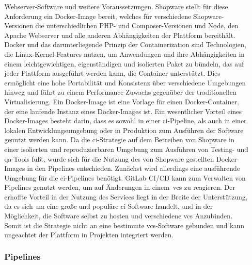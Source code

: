 Webserver-Software und weitere Voraussetzungen.
Shopware stellt für diese Anforderung ein Docker-Image bereit, welches für verschiedene Shopware-Versionen
die unterschiedlichen PHP- und Composer-Versionen und Node, den Apache Webserver und alle anderen Abhängigkeiten
der Plattform bereithält.
Docker und das darunterliegende Prinzip der Containerization sind Technologien, die Linux-Kernel-Features nutzen, um
Anwendungen und ihre Abhängigkeiten in einem leichtgewichtigen, eigenständigen und isolierten Paket zu bündeln, das auf
jeder Plattform ausgeführt werden kann, die Container unterstützt.
Dies ermöglicht eine hohe Portabilität und Konsistenz über verschiedene Umgebungen hinweg und führt zu einem
Performance-Zuwachs gegenüber der traditionellen Virtualisierung.
Ein Docker-Image ist eine Vorlage für einen Docker-Container, der eine laufende Instanz eines Docker-Images ist.
Ein wesentlicher Vorteil eines Docker-Images besteht darin, dass es sowohl in einer \acrshort{ci}-Pipeline, als auch in
einer lokalen Entwicklungsumgebung oder in Produktion zum Ausführen der Software genutzt werden kann.
Da die \acrshort{ci}-Strategie auf dem Betreiben von Shopware in einer isolierten und reproduzierbaren Umgebung zum
Ausführen von Testing- und \acrshort{qa}-Tools fußt, wurde sich für die Nutzung des von Shopware gestellten
Docker-Images in den Pipelines entschieden.
Zunächst wird allerdings eine ausführende Umgebung für die \acrshort{ci}-Pipelines benötigt.
GitLab CI/CD kann zum Verwalten von Pipelines genutzt werden, um auf Änderungen in einem\ \acrshort{vcs} zu reagieren.
Der erhoffte Vorteil in der Nutzung des Services liegt in der Breite der Unterstützung, da es sich um eine große und
populäre \acrshort{ci}-Software handelt, und in der Möglichkeit, die Software selbst zu hosten und verschiedene
\acrshort{vcs} Anzubinden.
Somit ist die Strategie nicht an eine bestimmte \acrshort{vcs}-Software gebunden und kann ungeachtet der Plattform in
Projekten integriert werden.

\subsubsection{Pipelines}

